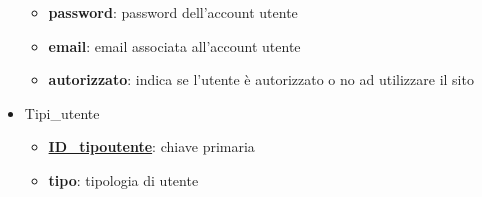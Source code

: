 \documentclass[12pt]{article}
\begin{document}
\begin{itemize}
\begin{itemize}
        \item \textbf{password}: password dell'account utente
        \item \textbf{email}: email associata all'account utente
        \item \textbf{autorizzato}: indica se l'utente è autorizzato o no ad utilizzare il sito
    \end{itemize}
    \item Tipi\_utente
    \begin{itemize}
        \item \textbf{\underline{ID\_tipoutente}}: chiave primaria
        \item \textbf{tipo}: tipologia di utente
    \end{itemize}
    
\end{itemize}

\newpage
\end{document}
